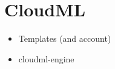 \section{CloudML}

\begin{itemize}
  \item Templates (and account)
  \item cloudml-engine
\end{itemize}
